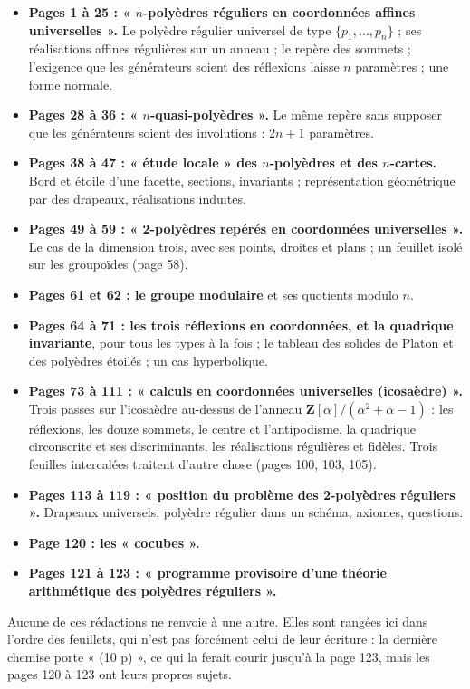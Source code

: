 \documentclass[11pt,a4paper]{article}
\begin{document}
\begin{itemize}
  \item \textbf{Pages 1 à 25 : « $n$-polyèdres réguliers en coordonnées affines
    universelles ».} Le polyèdre régulier universel de type $\{p_1, \dots,
    p_n\}$ ; ses réalisations affines régulières sur un anneau ; le repère des
    sommets ; l'exigence que les générateurs soient des réflexions laisse $n$
    paramètres ; une forme normale.
  \item \textbf{Pages 28 à 36 : « $n$-quasi-polyèdres ».} Le même repère sans
    supposer que les générateurs soient des involutions : $2n+1$ paramètres.
  \item \textbf{Pages 38 à 47 : « étude locale » des $n$-polyèdres et des
    $n$-cartes.} Bord et étoile d'une facette, sections, invariants ;
    représentation géométrique par des drapeaux, réalisations induites.
  \item \textbf{Pages 49 à 59 : « 2-polyèdres repérés en coordonnées
    universelles ».} Le cas de la dimension trois, avec ses points, droites et
    plans ; un feuillet isolé sur les groupoïdes (page 58).
  \item \textbf{Pages 61 et 62 : le groupe modulaire} et ses quotients
    modulo $n$.
  \item \textbf{Pages 64 à 71 : les trois réflexions en coordonnées, et la
    quadrique invariante}, pour tous les types à la fois ; le tableau des
    solides de Platon et des polyèdres étoilés ; un cas hyperbolique.
  \item \textbf{Pages 73 à 111 : « calculs en coordonnées universelles
    (icosaèdre) ».} Trois passes sur l'icosaèdre au-dessus de l'anneau
    $\mathbf{Z}[\alpha]/(\alpha^2 + \alpha - 1)$ : les réflexions, les douze
    sommets, le centre et l'antipodisme, la quadrique circonscrite et ses
    discriminants, les réalisations régulières et fidèles. Trois feuilles
    intercalées traitent d'autre chose (pages 100, 103, 105).
  \item \textbf{Pages 113 à 119 : « position du problème des 2-polyèdres
    réguliers ».} Drapeaux universels, polyèdre régulier dans un schéma,
    axiomes, questions.
  \item \textbf{Page 120 : les « cocubes ».}
  \item \textbf{Pages 121 à 123 : « programme provisoire d'une théorie
    arithmétique des polyèdres réguliers ».}
\end{itemize}

Aucune de ces rédactions ne renvoie à une autre. Elles sont rangées ici dans
l'ordre des feuillets, qui n'est pas forcément celui de leur écriture : la
dernière chemise porte « (10 p) », ce qui la ferait courir jusqu'à la
page 123, mais les pages 120 à 123 ont leurs propres sujets.
\end{document}
